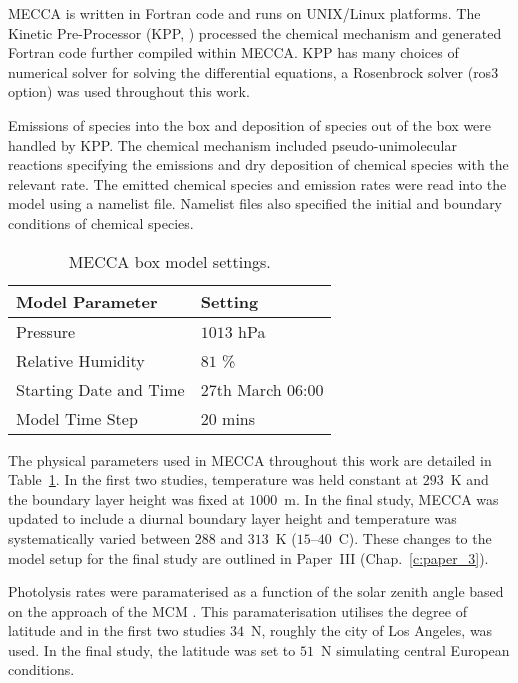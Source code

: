 MECCA is written in Fortran code and runs on UNIX/Linux platforms.
The Kinetic Pre-Processor (KPP, \citet{Damian:2002}) processed the chemical mechanism and generated Fortran code further compiled within MECCA.
KPP has many choices of numerical solver for solving the differential equations, a Rosenbrock solver (ros3 option) was used throughout this work.

Emissions of species into the box and deposition of species out of the box were handled by KPP.
The chemical mechanism included pseudo-unimolecular reactions specifying the emissions and dry deposition of chemical species with the relevant rate.
The emitted chemical species and emission rates were read into the model using a namelist file.  
Namelist files also specified the initial and boundary conditions of chemical species.

\begin{table}[t]%
    \begin{center}%
        \caption{MECCA box model settings.}%
        \begin{tabular}{ll}%
            \hline \hline
            \textbf{Model Parameter} & \textbf{Setting} \\
            \hline \hline
            Pressure & $1013$ hPa \\
            Relative Humidity & $81$ \% \\
            Starting Date and Time & 27th March 06:00 \\
            Model Time Step & $20$ mins \\
            \hline \hline
        \end{tabular}%
        \label{t:model_setup}%
    \end{center}%
\end{table}%
The physical parameters used in MECCA throughout this work are detailed in Table~\ref{t:model_setup}.
In the first two studies, temperature was held constant at $293$~K and the boundary layer height was fixed at $1000$~m.
In the final study, MECCA was updated to include a diurnal boundary layer height and temperature was systematically varied between $288$ and $313$~K ($15$--$40$~\degree C).
These changes to the model setup for the final study are outlined in Paper~III (Chap.~\ref{c:paper_3}).

Photolysis rates were paramaterised as a function of the solar zenith angle based on the approach of the MCM \citep{Jenkin:1997}.
This paramaterisation utilises the degree of latitude and in the first two studies $34$~\degree N, roughly the city of Los Angeles, was used.
In the final study, the latitude was set to $51$~\degree N simulating central European conditions.

